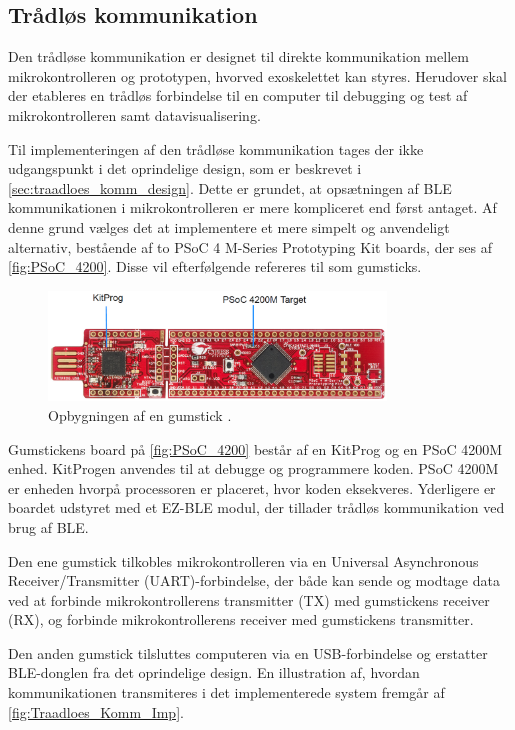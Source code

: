 \subsection{Trådløs kommunikation}\label{traadloes_komm_imp}
Den trådløse kommunikation er designet til direkte kommunikation mellem mikrokontrolleren og prototypen, hvorved exoskelettet kan styres. Herudover skal der etableres en trådløs forbindelse til en computer til debugging og test af mikrokontrolleren samt datavisualisering.   

\noindent
Til implementeringen af den trådløse kommunikation tages der ikke udgangspunkt i det oprindelige design, som er beskrevet i \autoref{sec:traadloes_komm_design}. Dette er grundet, at opsætningen af BLE kommunikationen i mikrokontrolleren er mere kompliceret end først antaget.
Af denne grund vælges det at implementere et mere simpelt og anvendeligt alternativ, bestående af to PSoC 4 M-Series Prototyping Kit boards, der ses af \autoref{fig:PSoC_4200}. Disse vil efterfølgende refereres til som gumsticks. 

\begin{figure}[H]
	\centering
	\includegraphics[width=0.8\textwidth]{figures/PSoC_4200_opdelt}
	\caption{Opbygningen af en gumstick \citep{cypresspsoc42015}.}
	\label{fig:PSoC_4200}
\end{figure}

\noindent
Gumstickens board på \autoref{fig:PSoC_4200} består af en KitProg og en PSoC 4200M enhed. KitProgen anvendes til at debugge og programmere koden. PSoC 4200M er enheden hvorpå processoren er placeret, hvor koden eksekveres. Yderligere er boardet udstyret med et EZ-BLE modul, der tillader trådløs kommunikation ved brug af BLE. 

Den ene gumstick tilkobles mikrokontrolleren via en Universal Asynchronous Receiver/Transmitter (UART)-forbindelse, der både kan sende og modtage data ved at forbinde mikrokontrollerens transmitter (TX) med gumstickens receiver (RX), og forbinde mikrokontrollerens receiver med gumstickens transmitter. 

Den anden gumstick tilsluttes computeren via en USB-forbindelse og erstatter BLE-donglen fra det oprindelige design. En illustration af, hvordan kommunikationen transmiteres i det implementerede system fremgår af \autoref{fig:Traadloes_Komm_Imp}.

